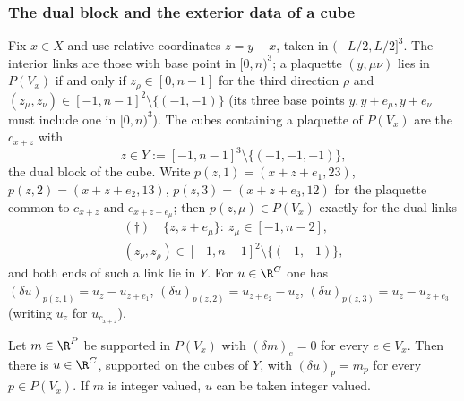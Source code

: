 \subsubsection{The dual block and the exterior data of a cube}
\label{rM3:block}

Fix $x\in X$ and use relative coordinates $z=y-x$, taken in
$(-L/2,L/2]^3$. The interior links are those with base point in
$[0,n)^3$; a plaquette $(y,\mu\nu)$ lies in $P(V_x)$ if and only if
$z_\rho\in[0,n-1]$ for the third direction $\rho$ and $(z_\mu,z_\nu)\in
[-1,n-1]^2\setminus\{(-1,-1)\}$ (its three base points $y,y+e_\mu,
y+e_\nu$ must include one in $[0,n)^3$). The cubes containing a plaquette
of $P(V_x)$ are the $c_{x+z}$ with
\[
z\in Y:=[-1,n-1]^3\setminus\{(-1,-1,-1)\},
\]
the dual block of the cube. Write $p(z,1)=(x+z+e_1,23)$, $p(z,2)=(x+z+e_2,
13)$, $p(z,3)=(x+z+e_3,12)$ for the plaquette common to $c_{x+z}$ and
$c_{x+z+e_\mu}$; then $p(z,\mu)\in P(V_x)$ exactly for the dual links
\begin{gather*}
(\dagger)\quad\{z,z+e_\mu\}:\ z_\mu\in[-1,n-2],\\
(z_\nu,z_\rho)\in[-1,n-1]^2\setminus\{(-1,-1)\},
\end{gather*}
and both ends of such a link lie in $Y$. For $u\in\R^C$ one has
$(\delta u)_{p(z,1)}=u_{z}-u_{z+e_1}$, $(\delta u)_{p(z,2)}=u_{z+e_2}-u_z$,
$(\delta u)_{p(z,3)}=u_z-u_{z+e_3}$ (writing $u_z$ for $u_{c_{x+z}}$).

\begin{lemma}\label{rM3:poincare}
Let $m\in\R^P$ be supported in $P(V_x)$ with $(\delta m)_e=0$ for every
$e\in V_x$. Then there is $u\in\R^C$, supported on the cubes of $Y$, with
$(\delta u)_p=m_p$ for every $p\in P(V_x)$. If $m$ is integer valued, $u$
can be taken integer valued.
\end{lemma}


